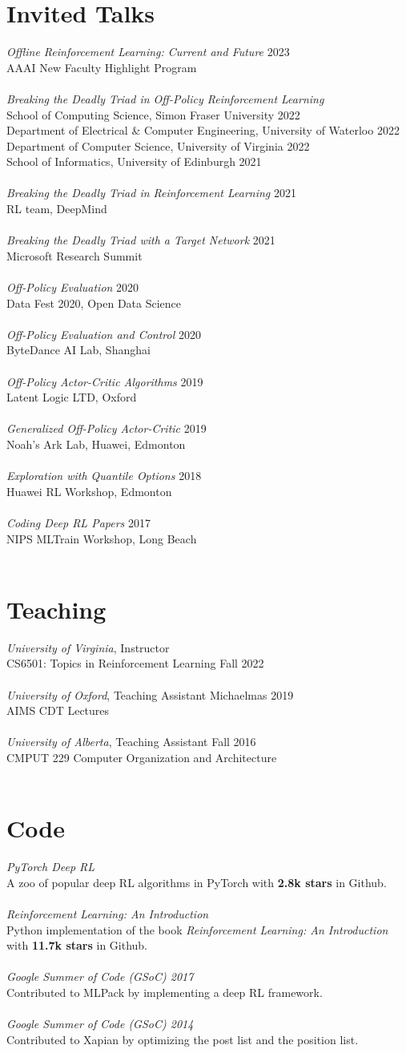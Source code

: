 \documentclass[margin, 10pt]{res} %
\newcommand*{\talk}[3]{{{\sl #2} \hfill #1 \\ #3 \\ \\}}
\newcommand*{\teaching}[4]{{{\sl #3}, #2 \hfill #1 \\ #4\\ \\}}
\newcommand*{\code}[2]{{{\sl #1} \\ #2 \\\\}}
\begin{document}
\begin{resume}
\section{Invited Talks}
\talk{2023}{Offline Reinforcement Learning: Current and Future}{AAAI New Faculty Highlight Program}
\talk{}{Breaking the Deadly Triad in Off-Policy Reinforcement Learning}{
School of Computing Science, Simon Fraser University \hfill 2022\\
Department of Electrical \& Computer Engineering, University of Waterloo \hfill 2022 \\
Department of Computer Science, University of Virginia \hfill 2022 \\
School of Informatics, University of Edinburgh \hfill 2021}
\talk{2021}{Breaking the Deadly Triad in Reinforcement Learning}{RL team, DeepMind}
\talk{2021}{Breaking the Deadly Triad with a Target Network}{Microsoft Research Summit}
\talk{2020}{Off-Policy Evaluation}{Data Fest 2020, Open Data Science}
\talk{2020}{Off-Policy Evaluation and Control}{ByteDance AI Lab, Shanghai}
\talk{2019}{Off-Policy Actor-Critic Algorithms}{Latent Logic LTD, Oxford}
\talk{2019}{Generalized Off-Policy Actor-Critic}{Noah's Ark Lab, Huawei, Edmonton}
\talk{2018}{Exploration with Quantile Options}{Huawei RL Workshop, Edmonton}
\talk{2017}{Coding Deep RL Papers}{NIPS MLTrain Workshop, Long Beach}

\section{Teaching}
\teaching{}{Instructor}{University of Virginia}{CS6501: Topics in Reinforcement Learning \hfill Fall 2022}
\teaching{Michaelmas 2019}{Teaching Assistant}{University of Oxford}{AIMS CDT Lectures}
\teaching{Fall 2016}{Teaching Assistant}{University of Alberta}{CMPUT 229 Computer Organization and Architecture}

\section{Code}
\code{PyTorch Deep RL}{A zoo of popular deep RL algorithms in PyTorch with \textbf{2.8k stars} in Github.}
\code{{Reinforcement Learning: An Introduction}}{Python implementation of the book \textit{Reinforcement Learning: An Introduction} \\ with \textbf{11.7k stars} in Github.}
\code{{Google Summer of Code (GSoC) 2017}}{Contributed to MLPack by implementing a deep RL framework.}
\code{{Google Summer of Code (GSoC) 2014}}{Contributed to Xapian by optimizing the post list and the position list.}


\end{resume}
\end{document}

